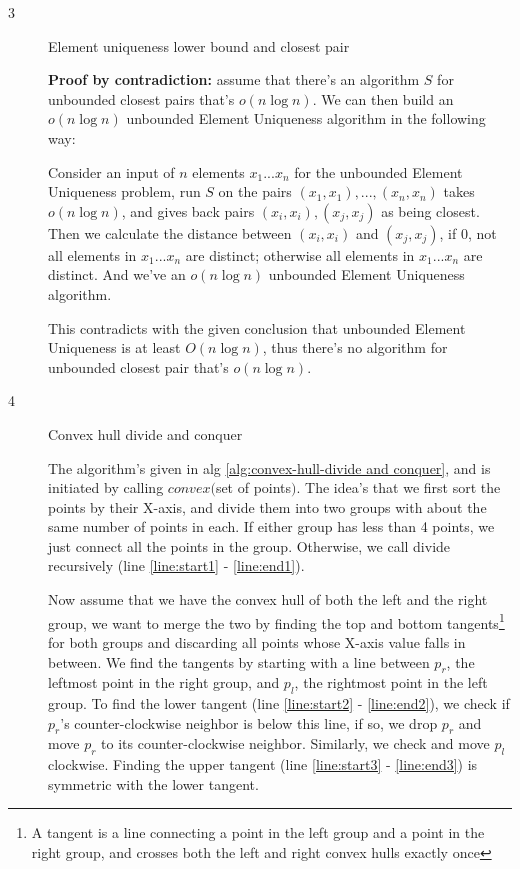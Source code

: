 \documentclass{article}
\begin{document}
\begin{description}
\item[3]{Element uniqueness lower bound and closest pair}
 
  \textbf{Proof by contradiction:} assume that there's an algorithm $S$ for unbounded closest pairs that's $o(n \log n)$. We can then build an $o(n \log n)$ unbounded Element Uniqueness algorithm in the following way:

  Consider an input of $n$ elements $x_1...x_n$ for the unbounded Element Uniqueness problem, run $S$ on the pairs $(x_1, x_1), ..., (x_n, x_n)$ takes $o (n \log n)$, and gives back pairs $(x_i, x_i), (x_j, x_j)$ as being closest. Then we calculate the distance between $(x_i, x_i)$ and $(x_j, x_j)$, if 0, not all elements in $x_1...x_n$ are distinct; otherwise all elements in $x_1...x_n$ are distinct. And we've an $o(n \log n)$ unbounded Element Uniqueness algorithm.

  This contradicts with the given conclusion that unbounded Element Uniqueness is at least $O(n \log n)$, thus there's no algorithm for unbounded closest pair that's $o(n \log n)$.

\item[4]{Convex hull divide and conquer}

  The algorithm's given in alg \ref{alg:convex-hull-divide and conquer}, and is initiated by calling $convex($set of points$)$. The idea's that we first sort the points by their X-axis, and divide them into two groups with about the same number of points in each. If either group has less than 4 points, we just connect all the points in the group. Otherwise, we call divide recursively (line \ref{line:start1} - \ref{line:end1}).

  Now assume that we have the convex hull of both the left and the right group, we want to merge the two by finding the top and bottom tangents\footnote{A tangent is a line connecting a point in the left group and a point in the right group, and crosses both the left and right convex hulls exactly once} for both groups and discarding all points whose X-axis value falls in between. We find the tangents by starting with a line between $p_r$, the leftmost point in the right group, and $p_l$, the rightmost point in the left group. To find the lower tangent (line \ref{line:start2} - \ref{line:end2}), we check if $p_r$'s counter-clockwise neighbor is below this line, if so, we drop $p_r$ and move $p_r$ to its counter-clockwise neighbor. Similarly, we check and move $p_l$ clockwise. Finding the upper tangent (line \ref{line:start3} - \ref{line:end3}) is symmetric with the lower tangent.


\end{description}
\end{document}
